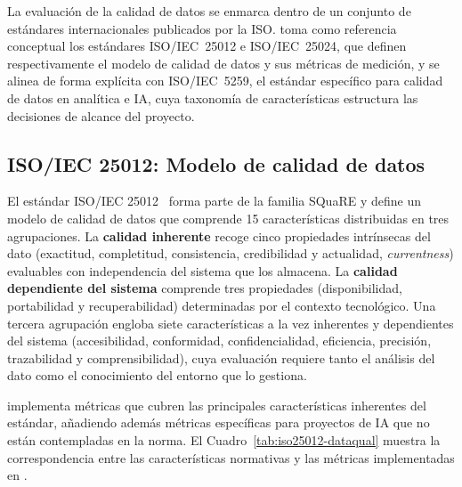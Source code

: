 La evaluación de la calidad de datos se enmarca dentro de un conjunto de
estándares internacionales publicados por la \ac{ISO}. \dataqual toma como
referencia conceptual los estándares \ac{ISO}/IEC~25012 e
\ac{ISO}/IEC~25024, que definen respectivamente el modelo de calidad de datos
y sus métricas de medición, y se alinea de forma explícita con
\ac{ISO}/IEC~5259, el estándar específico para calidad de datos en analítica
e \ac{IA}, cuya taxonomía de características estructura las decisiones de
alcance del proyecto.

\subsection{ISO/IEC 25012: Modelo de calidad de datos}
\label{sec:iso25012}

El estándar \ac{ISO}/IEC 25012~\citep{iso25012} forma parte de la familia
\ac{SQuaRE} y define un modelo de calidad de datos que comprende 15
características distribuidas en tres agrupaciones. La \textbf{calidad
inherente} recoge cinco propiedades intrínsecas del dato (exactitud,
completitud, consistencia, credibilidad y actualidad, \emph{currentness})
evaluables con independencia del sistema que los almacena. La
\textbf{calidad dependiente del sistema} comprende tres propiedades
(disponibilidad, portabilidad y recuperabilidad) determinadas por el contexto
tecnológico. Una tercera agrupación engloba siete características a la vez
inherentes y dependientes del sistema (accesibilidad, conformidad,
confidencialidad, eficiencia, precisión, trazabilidad y comprensibilidad),
cuya evaluación requiere tanto el análisis del dato como el conocimiento del
entorno que lo gestiona.

\dataqual implementa métricas que cubren las principales características
inherentes del estándar, añadiendo además métricas específicas para proyectos
de \ac{IA} que no están contempladas en la norma. El
Cuadro~\ref{tab:iso25012-dataqual} muestra la correspondencia entre las
características normativas y las métricas implementadas en \dataqual.

